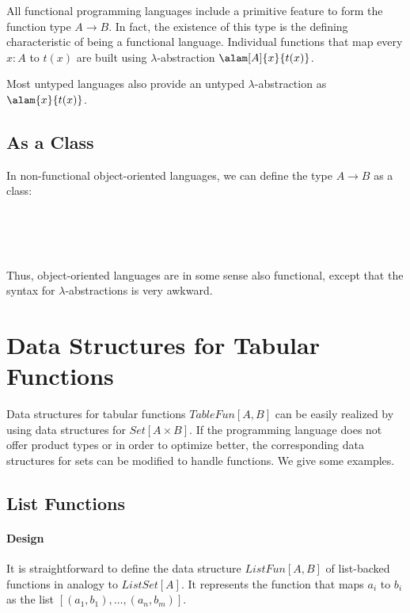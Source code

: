 All functional programming languages include a primitive feature to form the function type $A\to B$.
In fact, the existence of this type is the defining characteristic of being a functional language.
Individual functions that map every $x:A$ to $t(x)$ are built using $\lambda$-abstraction $\alam[A]{x}{t(x)}$.

Most untyped languages also provide an untyped $\lambda$-abstraction as $\alam{x}{t(x)}$.

\subsection{As a Class}

In non-functional object-oriented languages, we can define the type $A\to B$ as a class:

\begin{acode}
\\
\\
\tb{}\\
\end{acode}

Thus, object-oriented languages are in some sense also functional, except that the syntax for $\lambda$-abstractions is very awkward.

\section{Data Structures for Tabular Functions}

Data structures for tabular functions $TableFun[A,B]$ can be easily realized by using data structures for $Set[A\times B]$.
If the programming language does not offer product types or in order to optimize better, the corresponding data structures for sets can be modified to handle functions.
We give some examples.

\subsection{List Functions}

\paragraph{Design}
It is straightforward to define the data structure $ListFun[A,B]$ of list-backed functions in analogy to $ListSet[A]$.
It represents the function that maps $a_i$ to $b_i$ as the list $[(a_1,b_1),\ldots,(a_n,b_m)]$.

